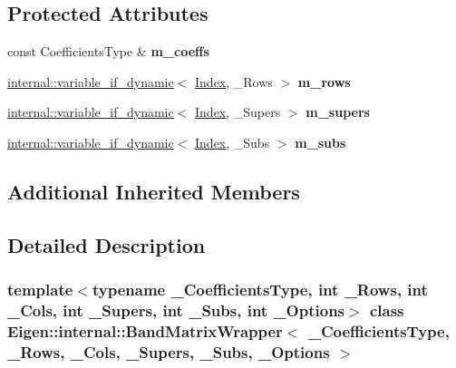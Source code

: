 \subsection*{Protected Attributes}
\begin{DoxyCompactItemize}
\item 
\mbox{\label{class_eigen_1_1internal_1_1_band_matrix_wrapper_a2554782e7bf11651b9fa5615de7da27c}} 
const Coefficients\+Type \& {\bfseries m\+\_\+coeffs}
\item 
\mbox{\label{class_eigen_1_1internal_1_1_band_matrix_wrapper_adf70622c3236b031c94683f385762e7a}} 
\hyperlink{class_eigen_1_1internal_1_1variable__if__dynamic}{internal\+::variable\+\_\+if\+\_\+dynamic}$<$ \hyperlink{group___core___module_a554f30542cc2316add4b1ea0a492ff02}{Index}, \+\_\+\+Rows $>$ {\bfseries m\+\_\+rows}
\item 
\mbox{\label{class_eigen_1_1internal_1_1_band_matrix_wrapper_a90b48c85c5e469e6a4098624106c94cf}} 
\hyperlink{class_eigen_1_1internal_1_1variable__if__dynamic}{internal\+::variable\+\_\+if\+\_\+dynamic}$<$ \hyperlink{group___core___module_a554f30542cc2316add4b1ea0a492ff02}{Index}, \+\_\+\+Supers $>$ {\bfseries m\+\_\+supers}
\item 
\mbox{\label{class_eigen_1_1internal_1_1_band_matrix_wrapper_ad798aca8009d828c85ad9449fc322267}} 
\hyperlink{class_eigen_1_1internal_1_1variable__if__dynamic}{internal\+::variable\+\_\+if\+\_\+dynamic}$<$ \hyperlink{group___core___module_a554f30542cc2316add4b1ea0a492ff02}{Index}, \+\_\+\+Subs $>$ {\bfseries m\+\_\+subs}
\end{DoxyCompactItemize}
\subsection*{Additional Inherited Members}


\subsection{Detailed Description}
\subsubsection*{template$<$typename \+\_\+\+Coefficients\+Type, int \+\_\+\+Rows, int \+\_\+\+Cols, int \+\_\+\+Supers, int \+\_\+\+Subs, int \+\_\+\+Options$>$\newline
class Eigen\+::internal\+::\+Band\+Matrix\+Wrapper$<$ \+\_\+\+Coefficients\+Type, \+\_\+\+Rows, \+\_\+\+Cols, \+\_\+\+Supers, \+\_\+\+Subs, \+\_\+\+Options $>$}



